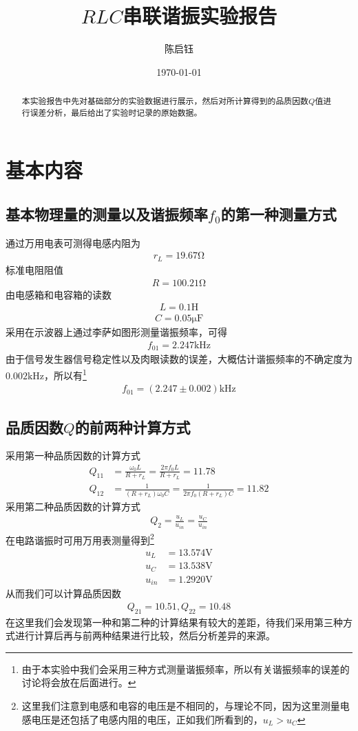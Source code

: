 \documentclass[a4paper]{ctexart}
\title{$RLC$串联谐振实验报告}
\date{\today}
\author{陈启钰}
\begin{document}
	\maketitle
	\newpage
	\begin{abstract}
		本实验报告中先对基础部分的实验数据进行展示，然后对所计算得到的品质因数$Q$值进行误差分析，最后给出了实验时记录的原始数据。
	\end{abstract}
	\tableofcontents
	\section{基本内容}
	\subsection{基本物理量的测量以及谐振频率$f_0$的第一种测量方式}
	通过万用电表可测得电感内阻为
	\begin{align}
		r_L=19.67\mathrm{\Omega}
	\end{align}
	标准电阻阻值
	\begin{align}
		R=100.21\mathrm{\Omega}
	\end{align}
	由电感箱和电容箱的读数
	\begin{align}
		L=0.1\mathrm{H}
	\end{align}
	\begin{align}
		C=0.05\mathrm{\mu F}
	\end{align}
	采用在示波器上通过李萨如图形测量谐振频率，可得
	\begin{align}
		f_{01}=2.247\mathrm{kHz}
	\end{align}
	由于信号发生器信号稳定性以及肉眼读数的误差，大概估计谐振频率的不确定度为$0.002\mathrm{kHz}$，所以有\footnote{由于本实验中我们会采用三种方式测量谐振频率，所以有关谐振频率的误差的讨论将会放在后面进行。}
	\begin{align}
		f_{01}=(2.247\pm 0.002)\mathrm{kHz}
	\end{align}
	\subsection{品质因数$Q$的前两种计算方式}
	采用第一种品质因数的计算方式
	\begin{align}
		Q_{11}&=\frac{\omega_0L}{R+r_L}=\frac{2\pi f_0L}{R+r_L}=11.78\\
		Q_{12}&=\frac{1}{(R+r_L)\omega_0C}=\frac{1}{2\pi f_0(R+r_L)C}=11.82
	\end{align}
	采用第二种品质因数的计算方式
	\begin{align}
		Q_{2}=\frac{u_L}{u_{in}}=\frac{u_C}{u_{in}}
	\end{align}
	在电路谐振时可用万用表测量得到\footnote{这里我们注意到电感和电容的电压是不相同的，与理论不同，因为这里测量电感电压是还包括了电感内阻的电压，正如我们所看到的，$u_L>u_C$}
	\begin{align}
		u_L&=13.574\mathrm{V}\\
		u_C&=13.538\mathrm{V}\\
		u_{in}&=1.2920\mathrm{V}
	\end{align}
	从而我们可以计算品质因数
	\begin{align}
		Q_{21}=10.51,Q_{22}=10.48
	\end{align}
	在这里我们会发现第一种和第二种的计算结果有较大的差距，待我们采用第三种方式进行计算后再与前两种结果进行比较，然后分析差异的来源。
\end{document}
